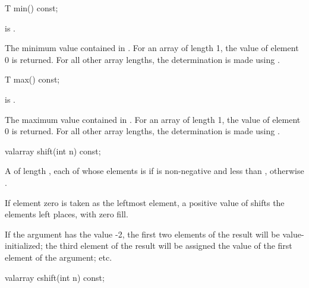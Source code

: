 %
\begin{itemdecl}
T min() const;
\end{itemdecl}

\begin{itemdescr}
\pnum
\expects
{} is .

\pnum
\returns
The minimum value contained in .
For an array of length 1, the value of element 0 is returned.
For all other array
lengths, the determination is made using
.
\end{itemdescr}

%
\begin{itemdecl}
T max() const;
\end{itemdecl}

\begin{itemdescr}
\pnum
\expects
{} is .

\pnum
\returns
The maximum value contained in .
For an array of length 1, the value of element 0 is returned.
For all other array
lengths, the determination is made using
.
\end{itemdescr}

%
\begin{itemdecl}
valarray shift(int n) const;
\end{itemdecl}

\begin{itemdescr}
\pnum
\returns
A  of length , each of whose elements
 is
if 
is non-negative and less than
, otherwise .
\begin{note}
If element zero is taken as the leftmost element,
a positive value of  shifts the elements left 
places, with zero fill.
\end{note}

\pnum
\begin{example}
If the argument has the value -2,
the first two elements of the result will be value-initialized; the third element of the result will be assigned the value
of the first element of the argument; etc.
\end{example}
\end{itemdescr}

%
\begin{itemdecl}
valarray cshift(int n) const;
\end{itemdecl}

